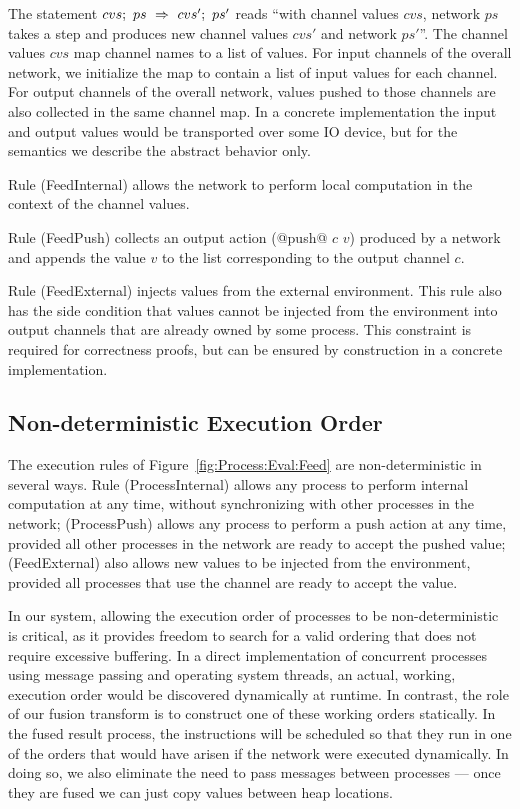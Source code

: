 The statement $cvs;~ps~\Rightarrow~cvs';~ps'$ reads ``with channel values $cvs$, network $ps$ takes a step and produces new channel values $cvs'$ and network $ps'$''. The channel values $cvs$ map channel names to a list of values. For input channels of the overall network, we initialize the map to contain a list of input values for each channel. For output channels of the overall network, values pushed to those channels are also collected in the same channel map. In a concrete implementation the input and output values would be transported over some IO device, but for the semantics we describe the abstract behavior only.

Rule (FeedInternal) allows the network to perform local computation in the context of the channel values. 

Rule (FeedPush) collects an output action (@push@ $c$ $v$) produced by a network and appends the value $v$ to the list corresponding to the output channel $c$. 

Rule (FeedExternal) injects values from the external environment. This rule also has the side condition that values cannot be injected from the environment into output channels that are already owned by some process. This constraint is required for correctness proofs, but can be ensured by construction in a concrete implementation.


\subsection{Non-deterministic Execution Order}
\label{s:EvaluationOrder}

The execution rules of Figure~\ref{fig:Process:Eval:Feed} are non-deterministic in several ways. Rule (ProcessInternal) allows any process to perform internal computation at any time, without synchronizing with other processes in the network; (ProcessPush) allows any process to perform a push action at any time, provided all other processes in the network are ready to accept the pushed value; (FeedExternal) also allows new values to be injected from the environment, provided all processes that use the channel are ready to accept the value.

In our system, allowing the execution order of processes to be non-deterministic is critical, as it provides freedom to search for a valid ordering that does not require excessive buffering.
In a direct implementation of concurrent processes using message passing and operating system threads, an actual, working, execution order would be discovered dynamically at runtime. In contrast, the role of our fusion transform is to construct one of these working orders statically. In the fused result process, the instructions will be scheduled so that they run in one of the orders that would have arisen if the network were executed dynamically. In doing so, we also eliminate the need to pass messages between processes --- once they are fused we can just copy values between heap locations.


